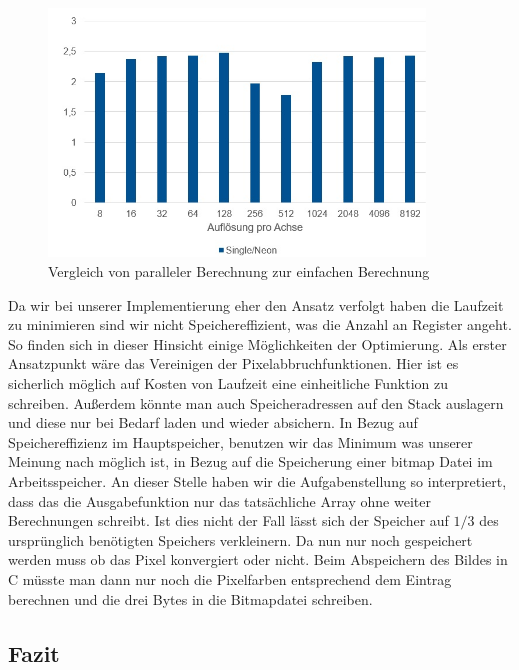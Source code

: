 \documentclass[11pt]{scrartcl}
\begin{document}
\begin{figure}[!ht]
  \begin{center}
    \includegraphics[width=10cm]{pictures/Geschwindigkeitsvergleich}
  \end{center}
  \caption{Vergleich von paralleler Berechnung zur einfachen Berechnung}
  \label{fig:v-Vergleich}
\end{figure}


Da wir bei unserer Implementierung eher den Ansatz verfolgt haben die Laufzeit zu minimieren sind wir nicht Speichereffizient, was die Anzahl an Register angeht.
So finden sich in dieser Hinsicht einige Möglichkeiten der Optimierung.
Als erster Ansatzpunkt wäre das Vereinigen der Pixelabbruchfunktionen.
Hier ist es sicherlich möglich auf Kosten von Laufzeit eine einheitliche Funktion zu schreiben.
Außerdem könnte man auch Speicheradressen auf den Stack auslagern und diese nur bei Bedarf laden und wieder absichern.
In Bezug auf Speichereffizienz im Hauptspeicher, benutzen wir das Minimum was unserer Meinung nach möglich ist, in Bezug auf die Speicherung einer bitmap Datei im Arbeitsspeicher.
An dieser Stelle haben wir die Aufgabenstellung so interpretiert, dass das die Ausgabefunktion nur das tatsächliche Array ohne weiter Berechnungen schreibt.
Ist dies nicht der Fall lässt sich der Speicher auf $1/3$ des ursprünglich benötigten Speichers verkleinern.
Da nun nur noch gespeichert werden muss ob das Pixel konvergiert oder nicht.
Beim Abspeichern des Bildes in C müsste man dann nur noch die Pixelfarben entsprechend dem Eintrag berechnen und die drei Bytes in die Bitmapdatei schreiben.


\subsection{Fazit}
\end{document}
